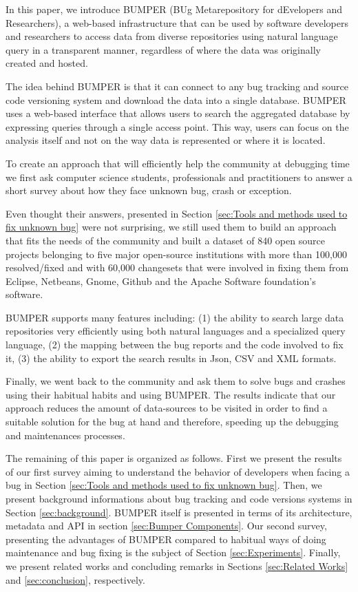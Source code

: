 \documentclass[conference]{IEEEtran}
\begin{document}
 In this paper, we introduce BUMPER (BUg Metarepository for dEvelopers and Researchers), a web-based infrastructure that can be used by software developers and researchers to access data from diverse repositories using natural language query in a transparent manner, regardless of where the data was originally created and hosted.

 The idea behind BUMPER is that it can connect to any bug tracking and source code versioning system and download the data into a single database.
 BUMPER uses a web-based interface that allows users to search the aggregated database by expressing queries through a single access point.
 This way, users can focus on the analysis itself and not on the way data is represented or where it is located.

 To create an approach that will efficiently help the community at debugging time we first ask computer science students, professionals and practitioners to answer a short survey about how they face unknown bug, crash or exception.

 Even thought their answers, presented in Section \ref{sec:Tools and methods used to fix unknown bug} were not surprising, we still used them to build an approach that fits the needs of the community and built a dataset of 840 open source projects belonging to five major open-source institutions with more than 100,000 resolved/fixed and with 60,000 changesets that were involved in fixing them from Eclipse, Netbeans, Gnome, Github and the Apache Software foundation's software.

 BUMPER supports many features including: (1) the ability to search large data repositories very efficiently using both natural languages and a specialized query language, (2) the mapping between the bug reports and the code involved to fix it, (3) the ability to export the search results in Json, CSV and XML formats.

 Finally, we went back to the community and ask them to solve bugs and crashes using their habitual habits and using BUMPER. The results indicate that our approach reduces the amount of data-sources to be visited in order to find a suitable solution for the bug at hand and therefore, speeding up the debugging and maintenances processes.

 The remaining of this paper is organized as follows. First we present the results of our first survey aiming to understand the behavior of developers when facing a bug in Section \ref{sec:Tools and methods used to fix unknown bug}. Then, we present background informations about bug tracking and code versions systems in Section \ref{sec:background}. BUMPER itself is presented in terms of its architecture, metadata and API in section \ref{sec:Bumper Components}. Our second survey, presenting the advantages of BUMPER compared to habitual ways of doing maintenance and bug fixing is the subject of Section \ref{sec:Experiments}. Finally, we present related works and concluding remarks in Sections \ref{sec:Related Works} and \ref{sec:conclusion}, respectively.
\end{document}
